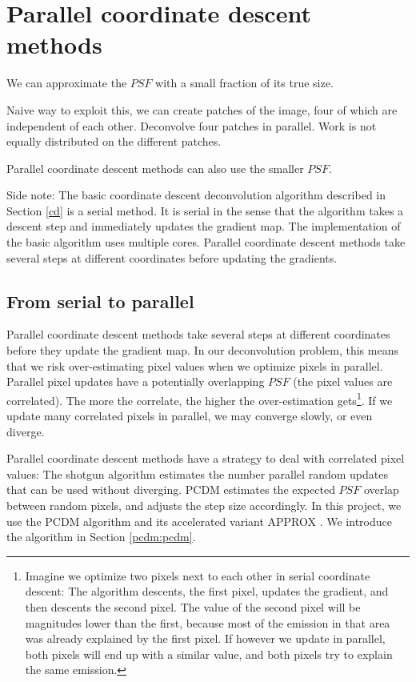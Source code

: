 \section{Parallel coordinate descent methods}\label{pcdm}
We can approximate the $PSF$ with a small fraction of its true size.

Naive way to exploit this, we can create patches of the image, four of which are independent of each other.
Deconvolve four patches in parallel.
Work is not equally distributed on the different patches. 

Parallel coordinate descent methods can also use the smaller $PSF$. 

Side note: The basic coordinate descent deconvolution algorithm described in Section \ref{cd} is a serial method. It is serial in the sense that the algorithm takes a descent step and immediately updates the gradient map. The implementation of the basic algorithm uses multiple cores. Parallel coordinate descent methods take several steps at different coordinates before updating the gradients.

\subsection{From serial to parallel}
Parallel coordinate descent methods take several steps at different coordinates before they update the gradient map. In our deconvolution problem, this means that we risk over-estimating pixel values when we optimize pixels in parallel. Parallel pixel updates have a potentially overlapping $PSF$ (the pixel values are correlated). The more the correlate, the higher the over-estimation gets\footnote{Imagine we optimize two pixels next to each other in serial coordinate descent: The algorithm descents, the first pixel, updates the gradient, and then descents the second pixel. The value of the second pixel will be magnitudes lower than the first, because most of the emission in that area was already explained by the first pixel. If however we update in parallel, both pixels will end up with a similar value, and both pixels try to explain the same emission.}. If we update many correlated pixels in parallel, we may converge slowly, or even diverge.

Parallel coordinate descent methods have a strategy to deal with correlated pixel values: The shotgun algorithm\cite{bradley2011parallel} estimates the number parallel random updates that can be used without diverging. PCDM\cite{richtarik2016parallel} estimates the expected $PSF$ overlap between random pixels, and adjusts the step size accordingly. In this project, we use the PCDM algorithm and its accelerated variant APPROX \cite{fercoq2015accelerated}. We introduce the algorithm in Section \ref{pcdm:pcdm}.

